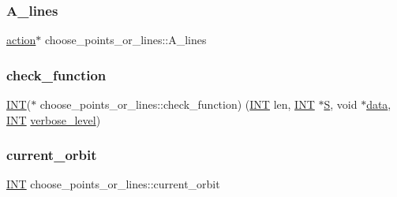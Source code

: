 \subsubsection{\texorpdfstring{A\+\_\+lines}{A\_lines}}
{\footnotesize\ttfamily \mbox{\hyperlink{classaction}{action}}$\ast$ choose\+\_\+points\+\_\+or\+\_\+lines\+::\+A\+\_\+lines}

\mbox{\label{classchoose__points__or__lines_abc61ef917f72864b7f56ca351c84832d}} 
\subsubsection{\texorpdfstring{check\+\_\+function}{check\_function}}
{\footnotesize\ttfamily \mbox{\hyperlink{galois_8h_a09fddde158a3a20bd2dcadb609de11dc}{I\+NT}}($\ast$ choose\+\_\+points\+\_\+or\+\_\+lines\+::check\+\_\+function) (\mbox{\hyperlink{galois_8h_a09fddde158a3a20bd2dcadb609de11dc}{I\+NT}} len, \mbox{\hyperlink{galois_8h_a09fddde158a3a20bd2dcadb609de11dc}{I\+NT}} $\ast$\mbox{\hyperlink{simeon_8_c_adab47f8243f1b5a2c31df2535d6b37d0}{S}}, void $\ast$\mbox{\hyperlink{classchoose__points__or__lines_a8afcc173b9891ea488adc7a8708b5185}{data}}, \mbox{\hyperlink{galois_8h_a09fddde158a3a20bd2dcadb609de11dc}{I\+NT}} \mbox{\hyperlink{simeon_8_c_a818073fbcc2f439e7c56952f67386122}{verbose\+\_\+level}})}

\mbox{\label{classchoose__points__or__lines_a5bd569fc8b518f5c245ac9a78c68ea8f}} 
\subsubsection{\texorpdfstring{current\+\_\+orbit}{current\_orbit}}
{\footnotesize\ttfamily \mbox{\hyperlink{galois_8h_a09fddde158a3a20bd2dcadb609de11dc}{I\+NT}} choose\+\_\+points\+\_\+or\+\_\+lines\+::current\+\_\+orbit}

\mbox{\label{classchoose__points__or__lines_a8afcc173b9891ea488adc7a8708b5185}} 

